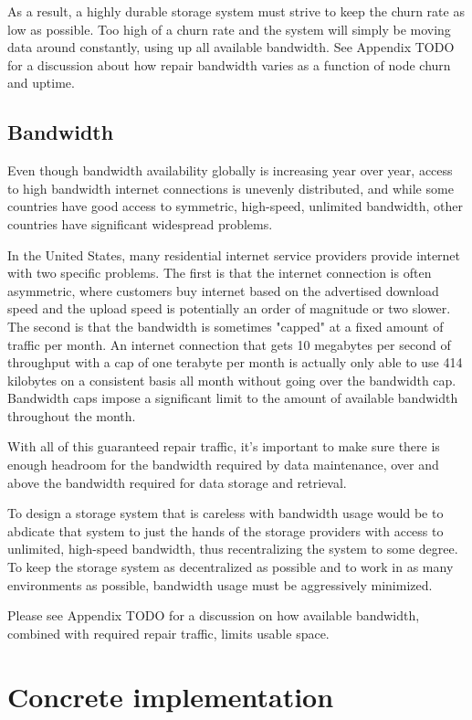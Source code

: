 \documentclass[a4paper,10pt]{article}
\newcommand{\todo}[1]{{\color{red} TODO #1}}
\begin{document}
As a result, a highly durable storage system must strive to keep the churn rate
as low as possible. Too high of a churn rate and the system will simply be
moving data around constantly, using up all available bandwidth. See Appendix
\todo{} for a discussion about how repair bandwidth varies as a function of
node churn and uptime.

\subsection{Bandwidth}

Even though bandwidth availability globally is increasing year over year, access
to high bandwidth internet connections is unevenly distributed, and while some
countries have good access to symmetric, high-speed, unlimited bandwidth, other
countries have significant widespread problems.

In the United States, many residential internet service providers provide
internet with two specific problems. The first is that the internet connection
is often asymmetric, where customers buy internet based on the advertised
download speed and the upload speed is potentially an order of magnitude or
two slower. The second is that the bandwidth is sometimes "capped" at a fixed
amount of traffic per month. An internet connection that gets 10 megabytes per
second of throughput with a cap of one terabyte per month is actually only able
to use 414 kilobytes on a consistent basis all month without going over the
bandwidth cap. Bandwidth caps impose a significant limit to the amount of
available bandwidth throughout the month.

With all of this guaranteed repair traffic, it's important to make sure there
is enough headroom for the bandwidth required by data maintenance, over and
above the bandwidth required for data storage and retrieval.

To design a storage system that is careless with bandwidth usage would be to
abdicate that system to just the hands of the storage providers with access to
unlimited, high-speed bandwidth, thus recentralizing the system to some degree.
To keep the storage system as decentralized as possible and to work in as many
environments as possible, bandwidth usage must be aggressively minimized.

Please see Appendix \todo{} for a discussion on how available bandwidth,
combined with required repair traffic, limits usable space.

\section{Concrete implementation}
\end{document}
